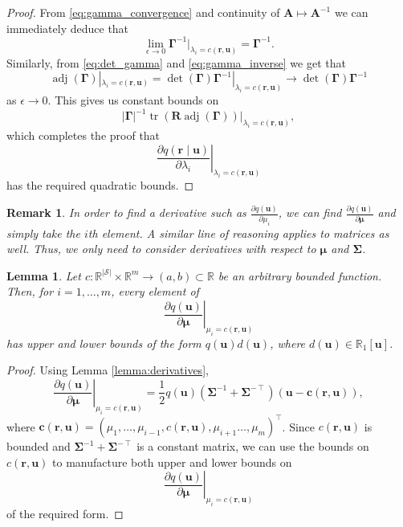 \documentclass{mpaper}
\newtheorem{lemma}[theorem]{Lemma}
\newtheorem{remark}[theorem]{Remark}
\DeclareMathOperator{\adj}{adj}
\DeclareMathOperator{\tr}{tr}
\begin{document}
\begin{proof}
  From \eqref{eq:gamma_convergence} and continuity of $\mathbf{A} \mapsto
  \mathbf{A}^{-1}$ we can immediately deduce that
  \begin{equation} \label{eq:gamma_inverse}
    \lim_{\epsilon \to 0} \bm\Gamma^{-1}|_{\lambda_i = c(\mathbf{r},
      \mathbf{u})} = \bm\Gamma^{-1}.
  \end{equation}
  Similarly, from \eqref{eq:det_gamma} and \eqref{eq:gamma_inverse} we get that
  \[
    \adj(\bm\Gamma)|_{\lambda_i = c(\mathbf{r}, \mathbf{u})} =
    \det(\bm\Gamma)\bm\Gamma^{-1}|_{\lambda_i = c(\mathbf{r}, \mathbf{u})} \to
    \det(\bm\Gamma)\bm\Gamma^{-1}
  \]
  as $\epsilon \to 0$. This gives us constant bounds on
  \[
    |\bm\Gamma|^{-1}\tr(\mathbf{R}\adj(\bm\Gamma))|_{\lambda_i = c(\mathbf{r},
      \mathbf{u})},
  \]
  which completes the proof that
  \[
    \left. \frac{\partial q(\mathbf{r} \mid \mathbf{u})}{\partial \lambda_i}
    \right|_{\lambda_i = c(\mathbf{r}, \mathbf{u})}
  \]
  has the required quadratic bounds.
\end{proof}

\begin{remark}
  In order to find a derivative such as $\frac{\partial q(\mathbf{u})}{\partial
    \mu_i}$, we can find $\frac{\partial q(\mathbf{u})}{\partial \bm\mu}$ and
  simply take the $i$th element. A similar line of reasoning applies to matrices
  as well. Thus, we only need to consider derivatives with respect to $\bm\mu$
  and $\bm\Sigma$.
\end{remark}

\begin{lemma} \label{lemma:bound2}
  Let $c : \mathbb{R}^{|\mathcal{S}|} \times \mathbb{R}^m \to (a, b) \subset
  \mathbb{R}$ be an arbitrary bounded function. Then, for $i = 1, \dots, m$,
  every element of
  \[
    \left. \frac{\partial q(\mathbf{u})}{\partial \bm\mu} \right|_{\mu_i =
      c(\mathbf{r}, \mathbf{u})}
  \]
  has upper and lower bounds of the form $q(\mathbf{u})d(\mathbf{u})$,
  where $d(\mathbf{u}) \in \mathbb{R}_1[\mathbf{u}]$.
\end{lemma}
\begin{proof}
  Using Lemma \ref{lemma:derivatives},
  \[
    \left. \frac{\partial q(\mathbf{u})}{\partial \bm\mu} \right|_{\mu_i =
      c(\mathbf{r}, \mathbf{u})} = \frac{1}{2}q(\mathbf{u})(\bm\Sigma^{-1} +
    \bm\Sigma^{-\intercal})(\mathbf{u} - \mathbf{c}(\mathbf{r}, \mathbf{u})),
  \]
  where $\mathbf{c}(\mathbf{r}, \mathbf{u}) = (\mu_1, \dots, \mu_{i - 1},
  c(\mathbf{r}, \mathbf{u}), \mu_{i + 1} \dots, \mu_m)^\intercal$. Since
  $c(\mathbf{r}, \mathbf{u})$ is bounded and $\bm\Sigma^{-1} +
  \bm\Sigma^{-\intercal}$ is a constant matrix, we can use the bounds on
  $c(\mathbf{r}, \mathbf{u})$ to manufacture both upper and lower bounds on
  \[
     \left. \frac{\partial q(\mathbf{u})}{\partial \bm\mu} \right|_{\mu_i =
      c(\mathbf{r}, \mathbf{u})}
  \]
  of the required form.
\end{proof}
\end{document}
